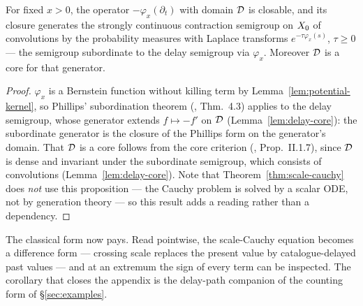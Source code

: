 \begin{proposition}\label{prop:fixed-scale-semigroup}
For fixed $x > 0$, the operator $-\varphi_x(\partial_t)$ with domain $\mathcal{D}$ is closable, and
its closure generates the strongly continuous contraction semigroup on $X_0$ of convolutions
by the probability measures with Laplace transforms $e^{-\tau \varphi_x(s)}$, $\tau \ge 0$
--- the semigroup subordinate to the delay semigroup via $\varphi_x$. Moreover $\mathcal{D}$ is a
core for that generator.
\end{proposition}

\begin{proof}
$\varphi_x$ is a Bernstein function without killing term by
Lemma~\ref{lem:potential-kernel}, so Phillips' subordination theorem
(, Thm.~4.3) applies to the delay semigroup, whose generator
extends $f \mapsto -f'$ on $\mathcal{D}$ (Lemma~\ref{lem:delay-core}): the subordinate generator is
the closure of the Phillips form on the generator's domain. That $\mathcal{D}$ is a core follows
from the core criterion (, Prop.~II.1.7), since $\mathcal{D}$ is dense and
invariant under the subordinate semigroup, which consists of convolutions
(Lemma~\ref{lem:delay-core}). Note that Theorem~\ref{thm:scale-cauchy} does \emph{not} use
this proposition --- the Cauchy problem is solved by a scalar ODE, not by generation theory
--- so this result adds a reading rather than a dependency.
\end{proof}

The classical form now pays. Read pointwise, the scale-Cauchy equation becomes a
difference form --- crossing scale replaces the present value by catalogue-delayed past
values --- and at an extremum the sign of every term can be inspected. The corollary that
closes the appendix is the delay-path companion of the counting form of
\S\ref{sec:examples}.

